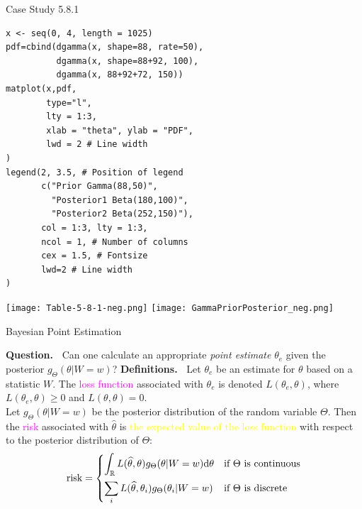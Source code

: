 \begin{frame}[fragile]{Case Study 5.8.1}

 \begin{minipage}{0.45\textwidth}
 \begin{lstlisting}
x <- seq(0, 4, length = 1025)
pdf=cbind(dgamma(x, shape=88, rate=50),
          dgamma(x, shape=88+92, 100),
          dgamma(x, 88+92+72, 150))
matplot(x,pdf,
        type="l",
        lty = 1:3,
        xlab = "theta", ylab = "PDF",
        lwd = 2 # Line width
)
legend(2, 3.5, # Position of legend
       c("Prior Gamma(88,50)",
         "Posterior1 Beta(180,100)",
         "Posterior2 Beta(252,150)"),
       col = 1:3, lty = 1:3,
       ncol = 1, # Number of columns
       cex = 1.5, # Fontsize
       lwd=2 # Line width
)
 \end{lstlisting}
 \end{minipage}
\begin{minipage}{0.5\textwidth}
 \begin{center}
 \texttt{[image: Table-5-8-1-neg.png]}
 \vspace{-2em}
 \texttt{[image: GammaPriorPosterior\_neg.png]}
 \end{center}
\end{minipage}
\end{frame}
\begin{frame}{Bayesian Point Estimation}

 {\bf Question.~} Can one calculate an appropriate {\em point estimate} $\theta_e$ given the posterior $g_\Theta(\theta|W=w)$?
 \vfill \pause
 {\bf Definitions.~}
Let $\theta_e$ be an estimate for $\theta$ based on a statistic $W$.
The \textcolor{magenta}{loss function} associated with $\theta_e$ is denoted $L(\theta_e,\theta)$, where $L(\theta_e,\theta)\ge 0$
and $L(\theta, \theta)=0$. \\[1em]\pause
Let $g_\Theta(\theta|W=w)$ be the posterior distribution of the random variable $\Theta$.
Then the \textcolor{magenta}{risk} associated with $\widehat\theta$ is
\textcolor{yellow}{the expected value of the loss function} with respect to the posterior distribution of $\Theta$:
\[
\text{risk}=
\begin{cases}
 \displaystyle \int_{\mathbb{R}} L(\widehat\theta,\theta) g_\Theta(\theta|W=w)\mathrm{d} \theta & \text{if $\Theta$ is continuous}\\[1em]
 \displaystyle \sum_{i} L(\widehat\theta,\theta_i) g_\Theta(\theta_i|W=w)& \text{if $\Theta$ is discrete}
\end{cases}
\]
\end{frame}
